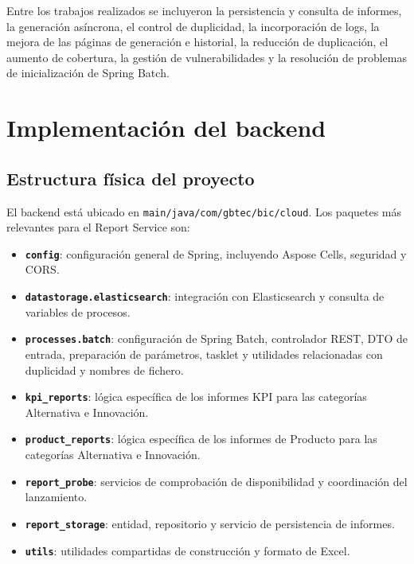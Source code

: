 \documentclass[11pt,a4paper,titlepage,oneside]{report}
\begin{document}
Entre los trabajos realizados se incluyeron la persistencia y consulta de
informes, la generación asíncrona, el control de duplicidad, la incorporación
de logs, la mejora de las páginas de generación e historial, la reducción de
duplicación, el aumento de cobertura, la gestión de vulnerabilidades y la
resolución de problemas de inicialización de Spring Batch. \\

\section{Implementación del backend}

\subsection{Estructura física del proyecto}

El backend está ubicado en \texttt{main/java/com/gbtec/bic/cloud}. Los paquetes
más relevantes para el Report Service son:

\begin{itemize}

  \item \textbf{\texttt{config}}: configuración general de Spring, incluyendo
  Aspose Cells, seguridad y CORS.

  \item \textbf{\texttt{datastorage.elasticsearch}}: integración con
  Elasticsearch y consulta de variables de procesos.

  \item \textbf{\texttt{processes.batch}}: configuración de Spring Batch,
  controlador REST, DTO de entrada, preparación de parámetros, tasklet y
  utilidades relacionadas con duplicidad y nombres de fichero.

  \item \textbf{\texttt{kpi\_reports}}: lógica específica de los informes KPI
  para las categorías Alternativa e Innovación.

  \item \textbf{\texttt{product\_reports}}: lógica específica de los informes
  de Producto para las categorías Alternativa e Innovación.

  \item \textbf{\texttt{report\_probe}}: servicios de comprobación de
  disponibilidad y coordinación del lanzamiento.

  \item \textbf{\texttt{report\_storage}}: entidad, repositorio y servicio de
  persistencia de informes.

  \item \textbf{\texttt{utils}}: utilidades compartidas de construcción y
  formato de Excel.

\end{itemize}
\end{document}
